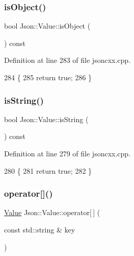 \subsubsection{\texorpdfstring{is\+Object()}{isObject()}}
{\footnotesize\ttfamily bool Json\+::\+Value\+::is\+Object (\begin{DoxyParamCaption}{ }\end{DoxyParamCaption}) const}



Definition at line 283 of file jsoncxx.\+cpp.


\begin{DoxyCode}
284     \{
285         \textcolor{keywordflow}{return} \textcolor{keyword}{true};
286     \}
\end{DoxyCode}
\mbox{\label{class_json_1_1_value_a71e1f82cf1c3eaf969d400dcffb163a6}} 
\subsubsection{\texorpdfstring{is\+String()}{isString()}}
{\footnotesize\ttfamily bool Json\+::\+Value\+::is\+String (\begin{DoxyParamCaption}{ }\end{DoxyParamCaption}) const}



Definition at line 279 of file jsoncxx.\+cpp.


\begin{DoxyCode}
280     \{
281         \textcolor{keywordflow}{return} \textcolor{keyword}{true};
282     \}
\end{DoxyCode}
\mbox{\label{class_json_1_1_value_a72e69b730d35131d867f47f13980c9c2}} 
\subsubsection{\texorpdfstring{operator[]()}{operator[]()}\hspace{0.1cm}{\footnotesize\ttfamily [1/2]}}
{\footnotesize\ttfamily \hyperlink{class_json_1_1_value}{Value} Json\+::\+Value\+::operator\mbox{[}$\,$\mbox{]} (\begin{DoxyParamCaption}\item[{const std\+::string \&}]{key }\end{DoxyParamCaption})}



